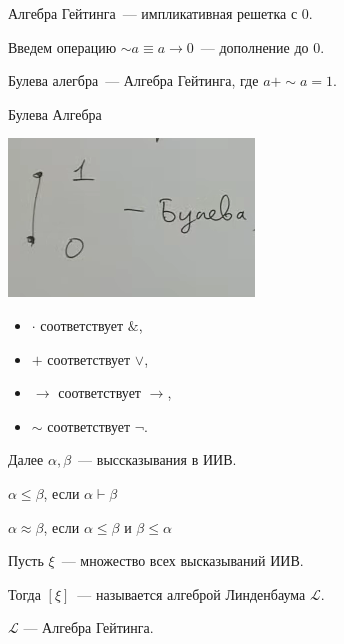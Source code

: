 \begin{definition}
    Алгебра Гейтинга~--- импликативная решетка с 0.

    Введем операцию $\sim a \equiv a \to 0$~--- дополнение до 0.
\end{definition}

\begin{definition}
    Булева алегбра~--- Алгебра Гейтинга, где $a + \sim a = 1$.
\end{definition}

\begin{example}
    Булева Алгебра

    \includegraphics[scale=0.8]{img/bool_algebra}
    
    \begin{itemize}
        \item $\cdot$ соответствует $\&$,
        \item $+$ соответствует $\vee$,
        \item $\to$ соответствует $\to$,
        \item $\sim$ соответствует $\neg$.
    \end{itemize}
\end{example}

Далее $\alpha, \beta$~--- выссказывания в ИИВ.

\begin{definition}
    $\alpha \leqslant \beta$, если $\alpha \vdash \beta$
\end{definition}

\begin{definition}
    $\alpha \approx \beta$, если $\alpha \leqslant \beta$ и $\beta \leqslant \alpha$
\end{definition}

\begin{definition}
    Пусть $\xi$~--- множество всех высказываний ИИВ.
    
    Тогда $[ \xi ]$~--- называется алгеброй Линденбаума $\mathcal{L}$.
\end{definition}

\begin{theorem}
    $\mathcal{L}$ --- Алгебра Гейтинга.
\end{theorem}

